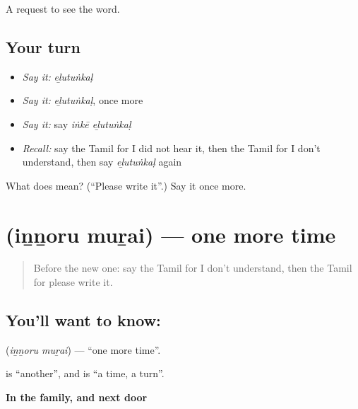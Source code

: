 \begin{grammarlens}[title={What you've built}]
A request to see the word.
\end{grammarlens}

\subsection*{Your turn}
\begin{itemize}
\raggedright
  \item \emph{Say it:} \emph{eḻutuṅkaḷ}
  \item \emph{Say it:} \emph{eḻutuṅkaḷ}, once more
  \item \emph{Say it:} say \emph{iṅkē eḻutuṅkaḷ}
  \item \emph{Recall:} say the Tamil for I did not hear it, then the Tamil for I don't understand, then say \emph{eḻutuṅkaḷ} again
\end{itemize}

\begin{tcolorbox}[breakable,colback=teal!4,colframe=teal!35!black,title={Before you move on}]
What does  mean? (\textquotedblleft{}Please write it\textquotedblright{}.) Say it once more.
\end{tcolorbox}
\section[\texorpdfstring{\ta{இன்னொரு} \ta{முறை} (iṉṉoru muṟai)}{இன்னொரு முறை (iṉṉoru muṟai)}]{  (iṉṉoru muṟai) — one more time}

\label{lesson:TA-C94-onemoretime}



\begin{quote}
Before the new one: say the Tamil for I don't understand, then the Tamil for please write it.
\end{quote}

\subsection*{You'll want to know:  }
\textbf{ } (\emph{iṉṉoru muṟai}) — \textquotedblleft{}one more time\textquotedblright{}.

\textbf{} is \textquotedblleft{}another\textquotedblright{}, and \textbf{} is \textquotedblleft{}a time, a turn\textquotedblright{}.

\textbf{In the family, and next door}

